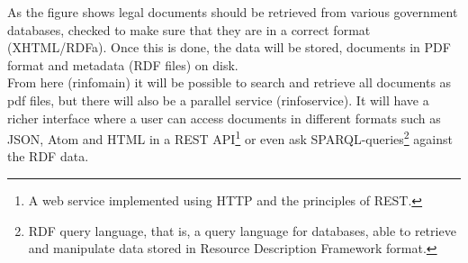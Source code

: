 As the figure shows legal documents should be retrieved from various government databases, checked to make sure that they are in a correct format (XHTML/RDFa). Once this is done, the data will be stored, documents in PDF format and metadata (RDF files) on disk.\\
From here (rinfomain) it will be possible to search and retrieve all documents as pdf files, but there will also be a parallel service (rinfoservice). It will have a richer interface where a user can access documents in different formats such as JSON, Atom and HTML in a REST API\footnote{A web service implemented using HTTP and the principles of REST. } or even ask SPARQL-queries\footnote{RDF query language, that is, a query language for databases, able to retrieve and manipulate data stored in Resource Description Framework format.} against the RDF data.   

